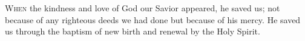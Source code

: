 \lettrine[lines=3,loversize=0.15]{W}{hen} the kindness and love of God our Savior appeared, he saved us; not because of any righteous deeds we had done but because of his mercy. He saved us through the baptism of new birth and renewal by the Holy Spirit.
